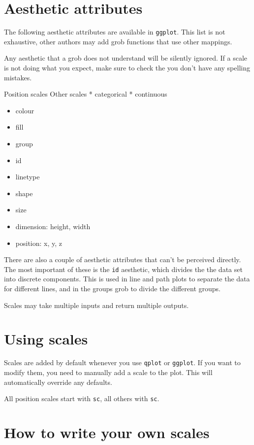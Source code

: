 \section{Aesthetic attributes}\label{sec:aesthetic_attributes}

The following aesthetic attributes are available in {\tt ggplot}.  This list is not exhaustive, other authors may add grob functions that use other mappings.  

Any aesthetic that a grob does not understand will be silently ignored.  If a scale is not doing what you expect, make sure to check the you don't have any spelling mistakes.

Position scales
Other scales
 * categorical
 * continuous

\begin{itemize}
	\item colour
	\item fill
	\item group
	\item id
	\item linetype
	\item shape
	\item size
	\item dimension: height, width
	\item position: x, y, z
\end{itemize}

There are also a couple of aesthetic attributes that can't be perceived directly.  The most important of these is the {\tt id} aesthetic, which divides the the data set into discrete components.   This is used in line and path plots to separate the data for different lines, and in the groups grob to divide the different groups. 

Scales may take multiple inputs and return multiple outputs.

\section{Using scales}\label{sec:using_scales}

Scales are added by default whenever you use {\tt qplot} or {\tt ggplot}.  If you want to modify them, you need to manually add a scale to the plot.  This will automatically override any defaults.


All position scales start with {\tt sc}, all others with {\tt sc}.

\section{How to write your own scales}\label{sec:how_to_write_your_own_scales}



